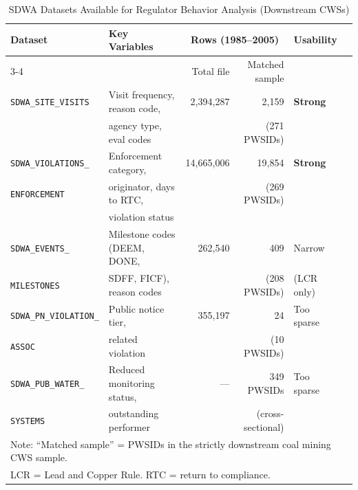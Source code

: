 
\begin{table}[h!]
\centering
\caption{SDWA Datasets Available for Regulator Behavior Analysis (Downstream CWSs)}
\label{tab:sdwa_inventory}
\small
\begin{tabular}{llrrll}
\hline\hline
Dataset & Key Variables & \multicolumn{2}{c}{Rows (1985--2005)} & Usability \\
\cmidrule(lr){3-4}
 & & Total file & Matched sample & \\
\hline
\texttt{SDWA\_SITE\_VISITS} & Visit frequency, reason code, & 2,394,287 & 2,159 & \textbf{Strong} \\
 & agency type, eval codes & & (271 PWSIDs) & \\[4pt]
\texttt{SDWA\_VIOLATIONS\_} & Enforcement category, & 14,665,006 & 19,854 & \textbf{Strong} \\
\texttt{ENFORCEMENT} & originator, days to RTC, & & (269 PWSIDs) & \\
 & violation status & & & \\[4pt]
\texttt{SDWA\_EVENTS\_} & Milestone codes (DEEM, DONE, & 262,540 & 409 & Narrow \\
\texttt{MILESTONES} & SDFF, FICF), reason codes & & (208 PWSIDs) & (LCR only) \\[4pt]
\texttt{SDWA\_PN\_VIOLATION\_} & Public notice tier, & 355,197 & 24 & Too sparse \\
\texttt{ASSOC} & related violation & & (10 PWSIDs) & \\[4pt]
\texttt{SDWA\_PUB\_WATER\_} & Reduced monitoring status, & --- & 349 PWSIDs & Too sparse \\
\texttt{SYSTEMS} & outstanding performer & & (cross-sectional) & \\
\hline\hline
\multicolumn{5}{l}{\footnotesize Note: ``Matched sample'' = PWSIDs in the strictly downstream coal mining CWS sample.} \\
\multicolumn{5}{l}{\footnotesize LCR = Lead and Copper Rule. RTC = return to compliance.} \\
\end{tabular}
\end{table}

